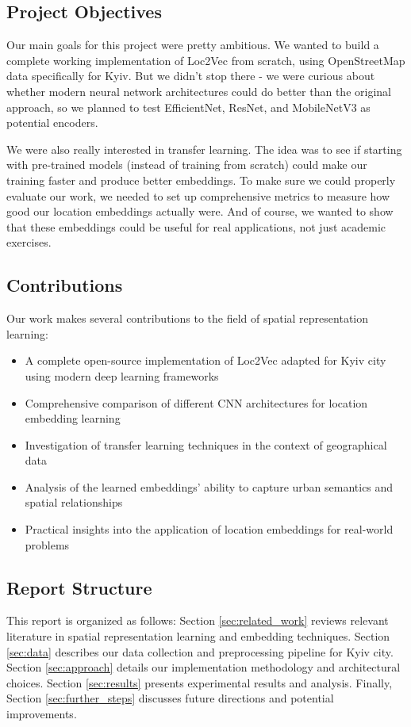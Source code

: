 \subsection{Project Objectives}

Our main goals for this project were pretty ambitious. We wanted to build a complete working implementation of Loc2Vec from scratch, using OpenStreetMap data specifically for Kyiv. But we didn't stop there - we were curious about whether modern neural network architectures could do better than the original approach, so we planned to test EfficientNet, ResNet, and MobileNetV3 as potential encoders.

We were also really interested in transfer learning. The idea was to see if starting with pre-trained models (instead of training from scratch) could make our training faster and produce better embeddings. To make sure we could properly evaluate our work, we needed to set up comprehensive metrics to measure how good our location embeddings actually were. And of course, we wanted to show that these embeddings could be useful for real applications, not just academic exercises.

\subsection{Contributions}

Our work makes several contributions to the field of spatial representation learning:

\begin{itemize}
    \item A complete open-source implementation of Loc2Vec adapted for Kyiv city using modern deep learning frameworks
    \item Comprehensive comparison of different CNN architectures for location embedding learning
    \item Investigation of transfer learning techniques in the context of geographical data
    \item Analysis of the learned embeddings' ability to capture urban semantics and spatial relationships
    \item Practical insights into the application of location embeddings for real-world problems
\end{itemize}

\subsection{Report Structure}

This report is organized as follows: Section \ref{sec:related_work} reviews relevant literature in spatial representation learning and embedding techniques. Section \ref{sec:data} describes our data collection and preprocessing pipeline for Kyiv city. Section \ref{sec:approach} details our implementation methodology and architectural choices. Section \ref{sec:results} presents experimental results and analysis. Finally, Section \ref{sec:further_steps} discusses future directions and potential improvements.
